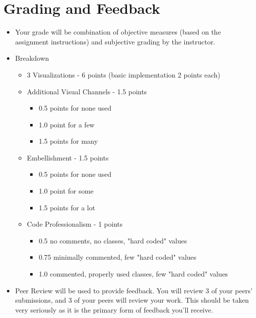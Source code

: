 \documentclass[a4paper,12pt]{article}
\begin{document}
\section{Grading and Feedback}

\feedback
\begin{itemize}
\item{Your grade will be combination of objective measures (based on the assignment instructions) and subjective grading by the instructor.}

\item{Breakdown}

\vspace{-5pt}
\begin{itemize}
	\item 3 Visualizations - 6 points (basic implementation 2 points each)
	\item Additional Visual Channels - 1.5 points 
		\begin{itemize}
    		\item 0.5 points for none used
    		\item 1.0 point for a few
            \item 1.5 points for many
		\end{itemize}
	\item Embellishment - 1.5 points 
		\begin{itemize}
    		\item 0.5 points for none used
    		\item 1.0 point for some
            \item 1.5 points for a lot
		\end{itemize}
	\item Code Professionalism - 1 points
		\begin{itemize}
            \item 0.5 no comments, no classes, "hard coded" values
            \item 0.75 minimally commented, few "hard coded" values
            \item 1.0 commented, properly used classes, few "hard coded" values
		\end{itemize}
\end{itemize}


\item{Peer Review will be used to provide feedback. You will review 3 of your peers' submissions, and 3 of your peers will review your work. This should be taken very seriously as it is the primary form of feedback you'll receive.}


\end{itemize}
\end{document}
